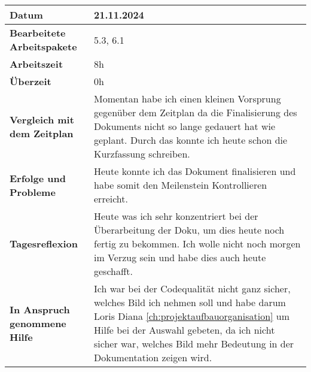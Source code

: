 \begin{longtable}{p{}|p{}}
	\hline
	\textbf{Datum}                       & 21.11.2024            \\
	\hline
	\textbf{Bearbeitete Arbeitspakete}   & 5.3, 6.1                  \\
	\hline
	\textbf{Arbeitszeit}                 & 8h                                    \\
	\hline
	\textbf{Überzeit}                    & 0h                                    \\
	\hline
	\textbf{Vergleich mit dem Zeitplan}  & Momentan habe ich einen kleinen Vorsprung gegenüber dem Zeitplan da die Finalisierung des Dokuments nicht so lange gedauert hat wie geplant. Durch das konnte ich heute schon die Kurzfassung schreiben. \\
	\hline
	\textbf{Erfolge und Probleme} & Heute konnte ich das Dokument finalisieren und habe somit den Meilenstein Kontrollieren erreicht.
	\\
	\hline
	\textbf{Tagesreflexion} & Heute was ich sehr konzentriert bei der Überarbeitung der Doku, um dies heute noch fertig zu bekommen. Ich wolle nicht noch morgen im Verzug sein und habe dies auch heute geschafft.
	\\
	\hline
	\textbf{In Anspruch genommene Hilfe} & Ich war bei der Codequalität nicht ganz sicher, welches Bild ich nehmen soll und habe darum Loris Diana \ref{ch:projektaufbauorganisation} um Hilfe bei der Auswahl gebeten, da ich nicht sicher war, welches Bild mehr Bedeutung in der Dokumentation zeigen wird.                           \\
	\hline
\end{longtable}\label{tab:arbeitsprotokoll-21.11.2024}
\newpage

